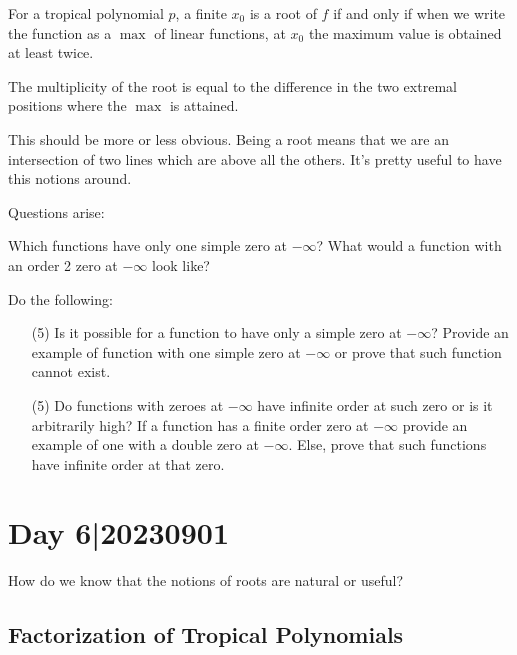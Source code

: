 \documentclass[12pt]{memoir}
\begin{document}
\begin{Lem}
For a tropical polynomial $p$, a finite $x_0$ is a root of $f$ if and only if when we write the function as a $\max$ of linear functions, at $x_0$ the maximum value is obtained at least twice.\par 
The multiplicity of the root is equal to the difference in the two extremal positions where the $\max$ is attained.
\end{Lem}

This should be more or less obvious. Being a root means that we are an intersection of two lines which are above all the others. It's pretty useful to have this notions around.

Questions arise:
\begin{significant}
    Which functions have only one simple zero at $-\infty$? What would a function with an order 2 zero at $-\infty$ look like?
\end{significant}

\begin{Ej}
    Do the following:
    \begin{itemize}
        \item[(5)] Is it possible for a function to have only a simple zero at $-\infty$? Provide an example of function with one simple zero at $-\infty$ or prove that such function cannot exist. 
        \item[(5)] Do functions with zeroes at $-\infty$ have infinite order at such zero or is it arbitrarily high? If a function has a finite order zero at $-\infty$ provide an example of one with a double zero at $-\infty$. Else, prove that such functions have infinite order at that zero.
    \end{itemize}
\end{Ej}

\section{Day 6|20230901}

How do we know that the notions of roots are natural or useful?

\subsection{Factorization of Tropical Polynomials}
\end{document}
